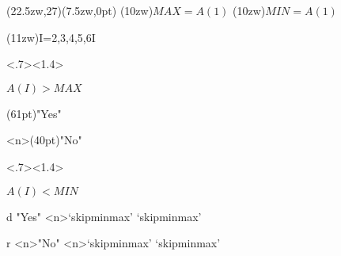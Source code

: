 \begin{caprm}
\begin{nagarezu}(22.5zw,27\baselineskip)(7.5zw,0pt)
  \downto
  \opbox(10zw){$MAX=A(1)$}
  \opbox(10zw){$MIN=A(1)$}
  \downto
  \begin{kurikaesi}(11zw){I=2,3,4,5,6}{I}
    \downto
    \begin{ifbox}<.7><1.4>{\strut$A(I)>MAX$}
      \begin{sitabunki}
        \downto(61pt)"Yes"
        \downto[skipminmax]
        \pushcurrentP
      \end{sitabunki}
      \begin{migibunki}
        \rightto<n>(40pt)"No"
        \downto
        \begin{ifbox}<.7><1.4>{\strut$A(I)<MIN$}
          \begin{branch}{d}
            \downto"Yes"
            \downto<n>`skipminmax'
            \leftto`skipminmax'
            \pushcurrentP
          \end{branch}%
          \begin{branch}{r}
            \rightto<n>"No"
            \downto<n>`skipminmax'
            \leftto`skipminmax'
          \end{branch}
        \end{ifbox}
      \end{migibunki}
    \end{ifbox}
  \end{kurikaesi}
  \downto
  \downto
\end{nagarezu}%
\end{caprm}
